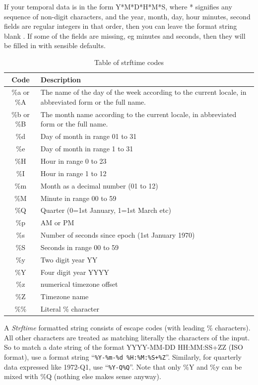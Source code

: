 If your temporal data is in the form Y{*}M{*}D{*}H{*}M{*}S, where
{*} signifies any sequence of non-digit characters, and the year,
month, day, hour minutes, second fields are regular integers in that
order, then you can leave the format string blank .
If some of the fields are missing, eg minutes and seconds, then they
will be filled in with sensible defaults.
\begin{center}
\par\end{center}

\begin{table}
\begin{tabular}{|c|p{}|}
\hline 
Code  & Description \tabularnewline
\hline 
\%a or \%A  & The name of the day of the week according to the current locale, in
abbreviated form or the full name.\tabularnewline
\%b or \%B  & The month name according to the current locale, in abbreviated form
or the full name.\tabularnewline
\%d  & Day of month in range 01 to 31\tabularnewline
\%e  & Day of month in range 1 to 31\tabularnewline
\%H  & Hour in range 0 to 23\tabularnewline
\%I  & Hour in range 1 to 12\tabularnewline
\%m  & Month as a decimal number (01 to 12)\tabularnewline
\%M  & Minute in range 00 to 59\tabularnewline
\%Q  & Quarter (0=1st January, 1=1st March etc)\tabularnewline
\%p  & AM or PM\tabularnewline
\%s  & Number of seconds since epoch (1st January 1970)\tabularnewline
\%S  & Seconds in range 00 to 59 \tabularnewline
\%y  & Two digit year YY\tabularnewline
\%Y  & Four digit year YYYY\tabularnewline
\%z  & numerical timezone offset\tabularnewline
\%Z  & Timezone name\tabularnewline
\%\%  & Literal \% character\tabularnewline
\hline 
\end{tabular}\caption{Table of strftime codes}
\label{Strftime code} 
\end{table}

A \emph{Strftime }formatted string consists of escape codes (with
leading \% characters). All other characters are treated as matching
literally the characters of the input. So to match a date string of
the format YYYY-MM-DD HH:MM:SS+ZZ (ISO format), use a format string
``\verb|%Y-%m-%d %H:%M:%S+%Z|''. Similarly, for quarterly data
expressed like 1972-Q1, use ``\verb+%Y-Q%Q+''. Note that only \%Y
and \%y can be mixed with \%Q (nothing else makes sense anyway).

